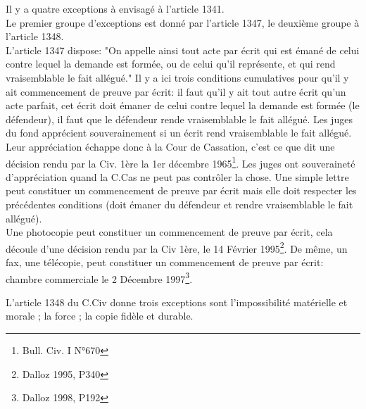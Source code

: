 Il y a quatre exceptions à envisagé à l'article 1341. \\
Le premier groupe d'exceptions est donné par l'article 1347, le deuxième groupe à l'article 1348. \\
L'article 1347 dispose: "On appelle ainsi tout acte par écrit qui est émané de celui contre lequel la demande est formée, ou de celui qu'il représente, et qui rend vraisemblable le fait allégué." Il y a ici trois conditions cumulatives pour qu'il y ait commencement de preuve par écrit: il faut qu'il y ait tout autre écrit qu'un acte parfait, cet écrit doit émaner de celui contre lequel la demande est formée (le défendeur), il faut que le défendeur rende vraisemblable le fait allégué. Les juges du fond apprécient souverainement si un écrit rend vraisemblable le fait allégué. Leur appréciation échappe donc à la Cour de Cassation, c'est ce que dit une décision rendu par la Civ. 1ère la 1er décembre 1965\footnote{Bull. Civ. I N°670}. Les juges ont souveraineté d'appréciation quand la C.Cas ne peut pas contrôler la chose. Une simple lettre peut constituer un commencement de preuve par écrit mais elle doit respecter les précédentes conditions (doit émaner du défendeur et rendre vraisemblable le fait allégué). \\
Une photocopie peut constituer un commencement de preuve par écrit, cela découle d'une décision rendu par la Civ 1ère, le 14 Février 1995\footnote{Dalloz 1995, P340}. De même, un fax, une télécopie, peut constituer un commencement de preuve par écrit: chambre commerciale le 2 Décembre 1997\footnote{Dalloz 1998, P192}. 


L'article 1348 du C.Civ donne trois exceptions sont l'impossibilité matérielle et morale ; la force ; la copie fidèle et durable. 



